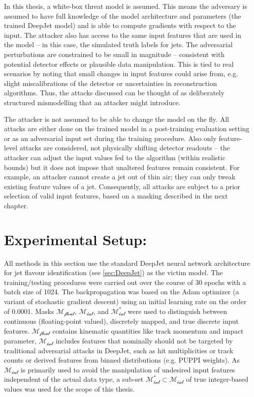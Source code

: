 In this thesis, a white-box threat model is assumed. This means the adversary is assumed to have full knowledge of the model architecture and parameters (the trained DeepJet model) and is able to compute gradients with respect to the input. The attacker also has access to the same input features that are used in the model – in this case, the simulated truth labels for jets. The adversarial perturbations are constrained to be small in magnitude – consistent with potential detector effects or plausible data manipulation. This is tied to real scenarios by noting that small changes in input features could arise from, e.g. slight miscalibrations of the detector or uncertainties in reconstruction algorithms. Thus, the attacks discussed can be thought of as deliberately structured mismodelling that an attacker might introduce.

The attacker is not assumed to be able to change the model on the fly. All attacks are either done on the trained model in a post-training evaluation setting or as an adversarial input set during the training procedure. Also only feature-level attacks are considered, not physically shifting detector readouts – the attacker can adjust the input values fed to the algorithm (within realistic bounds) but it does not impose that unaltered features remain consistent. For example, an attacker cannot create a jet out of thin air; they can only tweak existing feature values of a jet. Consequently, all attacks are subject to a prior selection of valid input features, based on a masking described in the next chapter.


\section{Experimental Setup:}
All methods in this section use the standard DeepJet neural network architecture for jet flavour identification (see \ref{sec:DeepJet}) as the victim model. The training/testing procedures were carried out over the course of 30 epochs with a batch size of 1024. The backpropagation was based on the Adam optimizer (a variant of stochastic gradient descent) using an initial learning rate on the order of $0.0001$. 
Masks $\mathcal{M_{\text{float}}}$, $\mathcal{M_{\text{int}}}$, and $\mathcal{M_{\text{int}}^*}$ were used to distinguish between continuous (floating-point valued), discretely mapped, and true discrete input features. 
$\mathcal{M_{\text{float}}}$ contains kinematic quantities like track momentum and impact parameter, $\mathcal{M_{\text{int}}}$ includes features that nominally should not be targeted by traditional adversarial attacks in DeepJet, such as hit multiplicities or track counts or derived features from binned distributions (e.g. PUPPI weights). As $\mathcal{M_{\text{int}}}$ is primarily used to avoid the manipulation of undesired input features independent of the actual data type, a sub-set $\mathcal{M_{\text{int}}^*}\subset\mathcal{M_{\text{int}}}$ of true integer-based values was used for the scope of this thesis. 

